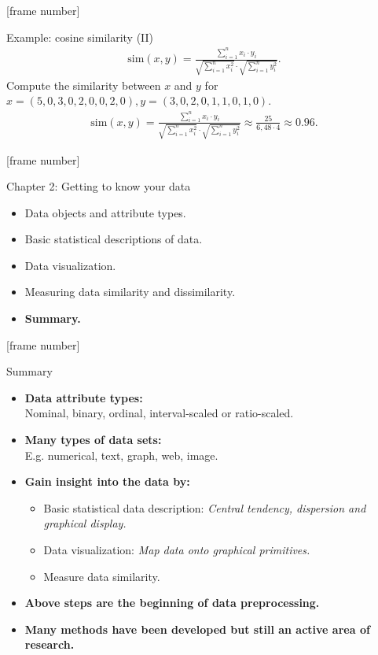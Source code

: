 \documentclass[aspectratio=169,t]{beamer}
\begin{document}
  {
    [frame number]
    \begin{frame}{Example: cosine similarity (II)}
    \begin{align}
      \text{sim}(x,y) = \frac{\sum_{i=1}^{n} x_i \cdot y_i}{\sqrt{\sum_{i=1}^{n}x_i^2}\cdot \sqrt{\sum_{i=1}^{n} y_i^2}}.
    \end{align}
    Compute the similarity between $x$ and $y$ for $x = (5,0,3,0,2,0,0,2,0), y = (3,0,2,0,1,1,0,1,0).$
    \begin{align}
      \text{sim}(x,y) = \frac{\sum_{i=1}^{n} x_i \cdot y_i}{\sqrt{\sum_{i=1}^{n}x_i^2}\cdot \sqrt{\sum_{i=1}^{n} y_i^2}} \approx \frac{25}{6,48 \cdot 4} \approx 0.96.
    \end{align}
    \end{frame}
  }

  {
    [frame number]
    \begin{frame}{Chapter 2: Getting to know your data}
    \centering
    \begin{itemize}
        \item Data objects and attribute types.
        \item Basic statistical descriptions of data.
        \item Data visualization.
        \item Measuring data similarity and dissimilarity.
        \item \textbf{Summary.}
    \end{itemize}
    \end{frame}
  }

  {
    [frame number]
    \begin{frame}{Summary}
    \centering
    \begin{itemize}
        \item \textbf{Data attribute types:}\\
              Nominal, binary, ordinal, interval-scaled or ratio-scaled.
        \item \textbf{Many types of data sets:}\\
              E.g. numerical, text, graph, web, image.
        \item \textbf{Gain insight into the data by:}
        \begin{itemize}
          \item Basic statistical data description: \emph{Central tendency, dispersion and graphical display.}
          \item Data visualization: \emph{Map data onto graphical primitives.}
          \item Measure data similarity.
        \end{itemize}
        \item \textbf{Above steps are the beginning of data preprocessing.}
        \item \textbf{Many methods have been developed but still an active area of research.}
    \end{itemize}
    \end{frame}
  }
\end{document}
